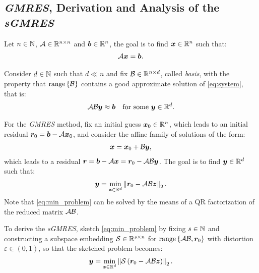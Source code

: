 \subsection{\textit{GMRES}, Derivation and Analysis of the \textit{sGMRES}}

Let $n \in \mathbb{N}$,  $\mathcal{A} \in \mathbb{R}^{n \times n}$ and $\bm{b} \in \mathbb{R}^{n}$, the goal is to find $\bm{x} \in \mathbb{R}^{n}$ such that:
\begin{align}
    \mathcal{A} \bm{x} = \bm{b}. \label{eq:system}
\end{align}

Consider $d \in \mathbb{N}$ such that $d \ll n$ and fix $\mathcal{B} \in \mathbb{R}^{n \times d}$, called \textit{basis}, with the property that $\operatorname*{range}\left\{\mathcal{B}\right\}$ contains a good approximate solution of \cref{eq:system}, that is:
\begin{align}
    \mathcal{A} \mathcal{B} \bm{y} &\approx \bm{b} &\text{for some } \bm{y} \in \mathbb{R}^{d}. \label{eq:app_system}
\end{align}

For the \textit{GMRES} method, fix an initial guess $\bm{x}_0 \in \mathbb{R}^{n}$, which leads to an initial residual $\bm{r}_0 = \bm{b} - \mathcal{A} \bm{x}_0$, and consider the affine family of solutions of the form:
\begin{align}
    \bm{x} = \bm{x}_0 + \mathcal{B} \bm{y},
\end{align}
which leads to a residual $\bm{r} = \bm{b} - \mathcal{A} \bm{x} = \bm{r}_0 - \mathcal{A} \mathcal{B} \bm{y}$. The goal is to find $\bm{y} \in \mathbb{R}^{d}$ such that:
\begin{align}
    \bm{y} = \min_{\bm{z} \in \mathbb{R}^{d}} \left\lVert \bm{r}_0 - \mathcal{A} \mathcal{B} \bm{z} \right\rVert_2. \label{eq:min_problem}
\end{align}
Note that \cref{eq:min_problem} can be solved by the means of a QR factorization of the reduced matrix $\mathcal{A} \mathcal{B}$.

To derive the \textit{sGMRES}, sketch \cref{eq:min_problem} by fixing $s \in \mathbb{N}$ and constructing a subspace embedding $\mathcal{S} \in \mathbb{R}^{s \times n}$ for $\operatorname*{range}\left\{\mathcal{A} \mathcal{B}, \bm{r}_0\right\}$ with distortion $\varepsilon \in \left(0, 1\right)$, so that the sketched problem becomes:
\begin{align}
    \bm{y} = \min_{\bm{z} \in \mathbb{R}^{d}} \left\lVert  \mathcal{S} \left( \bm{r}_0 - \mathcal{A} \mathcal{B} \bm{z} \right) \right\rVert_2. \label{eq:sketched_min_problem}
\end{align}

